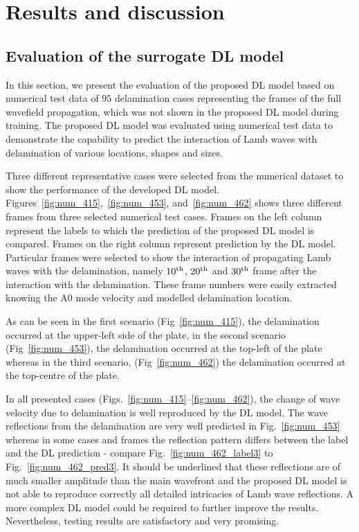 \section{Results and discussion}
\subsection{Evaluation of the surrogate DL model}
In this section, we present the evaluation of the proposed DL model based on numerical test data of \(95\) delamination cases representing the frames of the full wavefield propagation, which was not shown in the proposed DL model during training. 
The proposed DL model was evaluated using numerical test data to demonstrate the capability to predict the interaction of Lamb waves with delamination of various locations, shapes and sizes.

Three different representative cases were selected from the numerical dataset to show the performance of the developed DL model.
Figures~\ref{fig:num_415},~\ref{fig:num_453}, 
and~\ref{fig:num_462} shows three different frames from three selected numerical test cases.  
Frames on the left column represent the labels to which the prediction of the proposed DL model is compared.
Frames on the right column represent prediction by the DL model.
Particular frames were selected to show the interaction of propagating Lamb waves with the delamination, namely $10\textsuperscript{th}$, $20\textsuperscript{th}$ and $30\textsuperscript{th}$ frame after the interaction with the delamination. These frame numbers were easily extracted knowing the A0 mode velocity and modelled delamination location. 

As can be seen in the first scenario (Fig~\ref{fig:num_415}), the delamination occurred at the upper-left side of the plate, in the second scenario (Fig~\ref{fig:num_453}), the delamination occurred at the top-left of the plate whereas in the third scenario, (Fig~\ref{fig:num_462}) the delamination occurred at the top-centre of the plate. 

In all presented cases (Figs.~\ref{fig:num_415}--\ref{fig:num_462}), the change of wave velocity due to delamination is well reproduced by the DL model.
The wave reflections from the delamination are very well predicted in Fig.~\ref{fig:num_453} whereas in some cases and frames the reflection pattern differs between the label and the DL prediction - compare Fig.~\ref{fig:num_462_label3} to Fig.~\ref{fig:num_462_pred3}.
It should be underlined that these reflections are of much smaller amplitude than the main wavefront and the proposed DL model is not able to reproduce correctly all detailed intricacies of Lamb wave reflections. 
A more complex DL model could be required to further improve the results.
Nevertheless, testing results are satisfactory and very promising.

